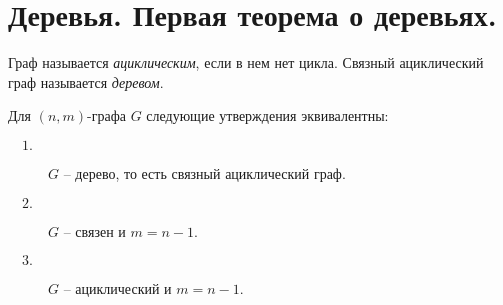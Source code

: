 \section{Деревья. Первая теорема о деревьях.}

\begin{definition}
    Граф называется \emph{ациклическим}, если в нем нет цикла. Связный ациклический граф называется \emph{деревом}.
\end{definition}

\begin{theorem}
    Для $ (n,m) $-графа $ G $ следующие утверждения эквивалентны:
    \begin{description}
        \item[$ \quad 1. $] $ G $ -- дерево, то есть связный ациклический граф.
        \item[$ \quad 2. $] $ G $ -- связен и $ m = n - 1 $.
        \item[$ \quad 3. $] $ G $ -- ациклический и $ m=n-1 $.
    \end{description}
\end{theorem}

